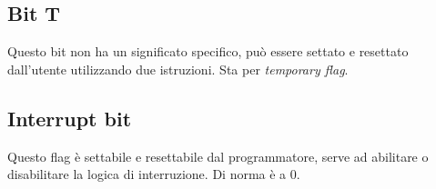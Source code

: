 \subsection{Bit T}
Questo bit non ha un significato specifico, può essere settato e resettato dall'utente utilizzando due istruzioni. Sta per \emph{temporary flag}.

\subsection{Interrupt bit}
Questo flag è settabile e resettabile dal programmatore, serve ad abilitare o disabilitare la logica di interruzione.
Di norma è a 0.

